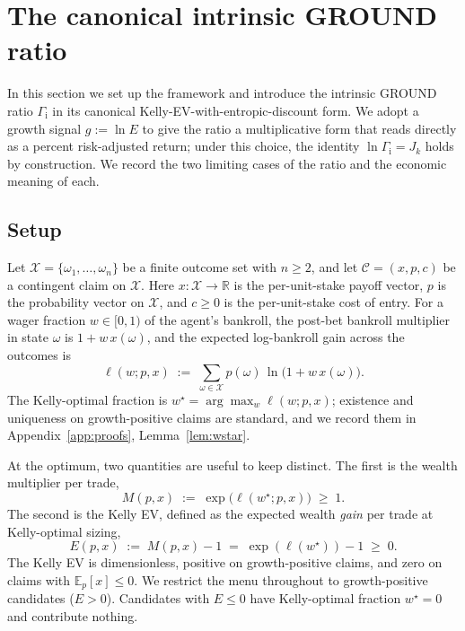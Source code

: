 \documentclass[11pt]{article}
\theoremstyle{definition}
\theoremstyle{remark}
\newcommand{\E}{\mathbb{E}}
\newcommand{\R}{\mathbb{R}}
\newcommand{\C}{\mathcal{C}}
\newcommand{\X}{\mathcal{X}}
\newcommand{\GROUND}{\Gamma_{\mathrm{i}}}
\begin{document}
\section{The canonical intrinsic GROUND ratio}\label{sec:framework}

In this section we set up the framework and introduce the intrinsic
GROUND ratio $\GROUND$ in its canonical Kelly-EV-with-entropic-discount form.
We adopt a growth signal $g := \ln E$ to give the ratio a multiplicative
form that reads directly as a percent risk-adjusted return; under this choice,
the identity $\ln \GROUND = J_k$ holds by construction. We record the two
limiting cases of the ratio and the economic meaning of each.

\subsection{Setup}

Let $\X = \{\omega_1, \ldots, \omega_n\}$ be a finite outcome set
with $n \ge 2$, and let $\C = (x, p, c)$ be a contingent claim on
$\X$. Here $x: \X \to \R$ is the per-unit-stake payoff vector, $p$
is the probability vector on $\X$, and $c \ge 0$ is the
per-unit-stake cost of entry. For a wager fraction $w \in [0, 1)$
of the agent's bankroll, the post-bet bankroll multiplier in state
$\omega$ is $1 + w \, x(\omega)$, and the expected log-bankroll gain
across the outcomes is
\begin{equation}
\ell(w; p, x) \;:=\; \sum_{\omega \in \X} p(\omega) \, \ln\bigl(1 + w \, x(\omega)\bigr).
\label{eq:loggrowth}
\end{equation}
The Kelly-optimal fraction is $w^\star = \arg\max_w \ell(w; p, x)$;
existence and uniqueness on growth-positive claims are standard, and
we record them in Appendix~\ref{app:proofs}, Lemma~\ref{lem:wstar}.

At the optimum, two quantities are useful to keep distinct. The
first is the wealth multiplier per trade,
\begin{equation}
M(p, x) \;:=\; \exp\bigl(\ell(w^\star; p, x)\bigr) \;\ge\; 1.
\label{eq:M}
\end{equation}
The second is the Kelly EV, defined as the expected wealth
\emph{gain} per trade at Kelly-optimal sizing,
\begin{equation}
E(p, x) \;:=\; M(p, x) - 1 \;=\; \exp(\ell(w^\star)) - 1 \;\ge\; 0.
\label{eq:E}
\end{equation}
The Kelly EV is dimensionless, positive on growth-positive claims,
and zero on claims with $\E_p[x] \le 0$. We restrict the menu
throughout to growth-positive candidates ($E > 0$). Candidates with
$E \le 0$ have Kelly-optimal fraction $w^\star = 0$ and contribute
nothing.
\end{document}
